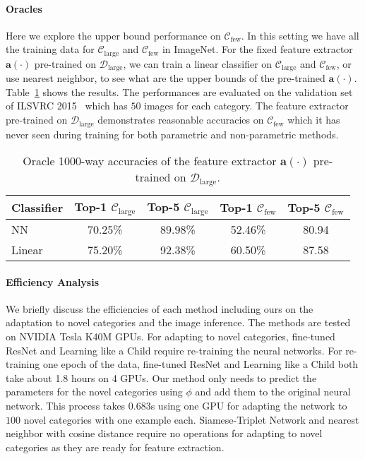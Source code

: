 \paragraph{Oracles}
Here we explore the upper bound performance on $\mathcal{C}_{\text{few}}$.
In this setting we have all the training data for $\mathcal{C}_{\text{large}}$ and $\mathcal{C}_{\text{few}}$ in ImageNet.
For the fixed feature extractor $\mathbf{a}(\cdot)$ pre-trained on $\mathcal{D}_{\text{large}}$, we can train a linear classifier on $\mathcal{C}_{\text{large}}$ and $\mathcal{C}_{\text{few}}$, or use nearest neighbor, to see what are the upper bounds of the pre-trained $\mathbf{a}(\cdot)$. Table~\ref{tab:oracle} shows the results.
The performances are evaluated on the validation set of ILSVRC 2015~\cite{ILSVRC15} which has $50$ images for each category. The feature extractor pre-trained on $\mathcal{D}_{\text{large}}$ demonstrates reasonable accuracies on $\mathcal{C}_{\text{few}}$ which it has never seen during training for both parametric and non-parametric methods.

\begin{table}
    \small
    \centering
    \vspace{0.05in}
    \setlength{\tabcolsep}{0.5em}
    \begin{tabular}{lcccc}
        \toprule
        Classifier & Top-1 $\mathcal{C}_{\text{large}}$ & Top-5 $\mathcal{C}_{\text{large}}$ & Top-1 $\mathcal{C}_{\text{few}}$ & Top-5 $\mathcal{C}_{\text{few}}$\\
        \midrule
        NN & 70.25\% & 89.98\% & 52.46\% & 80.94 \\
        Linear & 75.20\% & 92.38\% & 60.50\% & 87.58 \\
        \bottomrule
    \end{tabular}
    \caption{Oracle 1000-way accuracies of the feature extractor $\mathbf{a}(\cdot)$ pre-trained on $\mathcal{D}_{\text{large}}$.}
    \label{tab:oracle}
\end{table}

\paragraph{Efficiency Analysis}
We briefly discuss the efficiencies of each method including ours on the adaptation to novel categories and the image inference.
The methods are tested on NVIDIA Tesla K40M GPUs.
For adapting to novel categories, fine-tuned ResNet and Learning like a Child require re-training the neural networks.
For re-training one epoch of the data, fine-tuned ResNet and Learning like a Child both take about 1.8 hours on 4 GPUs.
Our method only needs to predict the parameters for the novel categories using $\phi$ and add them to the original neural network.
This process takes 0.683s using one GPU for adapting the network to $100$ novel categories with one example each.
Siamese-Triplet Network and nearest neighbor with cosine distance require no operations for adapting to novel categories as they are ready for feature extraction.

